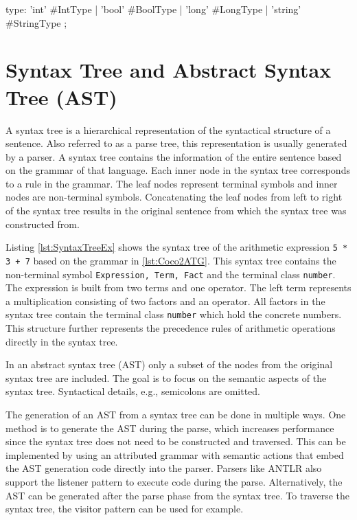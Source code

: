 \begin{AntlrCode}[float,numbers=none,caption=Example rule using alternative labels for the rule alternatives., label=lst:ANTLRRuleAlt]
  type:
        'int'     #IntType
      | 'bool'    #BoolType
      | 'long'    #LongType
      | 'string'  #StringType
      ;
\end{AntlrCode}

\section{Syntax Tree and Abstract Syntax Tree (AST)}

A syntax tree is a hierarchical representation of the syntactical structure of a sentence. Also referred to as a parse tree, this representation is usually generated by a parser. A syntax tree contains the information of the entire sentence based on the grammar of that language. Each inner node in the syntax tree corresponds to a rule in the grammar. The leaf nodes represent terminal symbols and inner nodes are non-terminal symbols. Concatenating the leaf nodes from left to right of the syntax tree results in the original sentence from which the syntax tree was constructed from. 

Listing \ref{lst:SyntaxTreeEx} shows the syntax tree of the arithmetic expression \texttt{5 * 3 + 7} based on the grammar in \ref{lst:Coco2ATG}. 
This syntax tree contains the non-terminal symbol \texttt{Expression, Term, Fact} and the terminal class \texttt{number}. The expression is built from two terms and one operator. The left term represents a multiplication consisting of two factors and an operator. All factors in the syntax tree contain the terminal class \texttt{number} which hold the concrete numbers. This structure further represents the precedence rules of arithmetic operations directly in the syntax tree.  

In an abstract syntax tree (AST) only a subset of the nodes from the original syntax tree are included. The goal is to focus on the semantic aspects of the syntax tree. Syntactical details, e.g., semicolons are omitted. 

The generation of an AST from a syntax tree can be done in multiple ways. One method is to generate the AST during the parse, which increases performance since the syntax tree does not need to be constructed and traversed. This can be implemented by using an attributed grammar with semantic actions that embed the AST generation code directly into the parser. Parsers like ANTLR also support the listener pattern to execute code during the parse. Alternatively, the AST can be generated after the parse phase from the syntax tree. To traverse the syntax tree, the visitor pattern can be used for example.  

